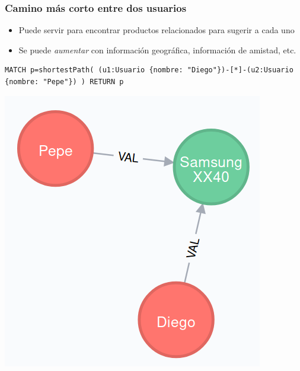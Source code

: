 \documentclass[14pt]{beamer}
\begin{document}
\begin{frame}
  \frametitle{Camino más corto entre dos usuarios}
  \begin{itemize}
  \item Puede servir para encontrar productos relacionados para sugerir a
    cada uno
  \item Se puede {\em aumentar} con información geográfica, información de
    amistad, etc.
  \end{itemize}
\begin{lstlisting}[language=cypher]
MATCH p=shortestPath( (u1:Usuario {nombre: "Diego"})-[*]-(u2:Usuario {nombre: "Pepe"}) ) RETURN p
\end{lstlisting}
  \begin{center}
    \includegraphics[height=.5\textheight]{img/neo4j3}
  \end{center}
\end{frame}
\end{document}
